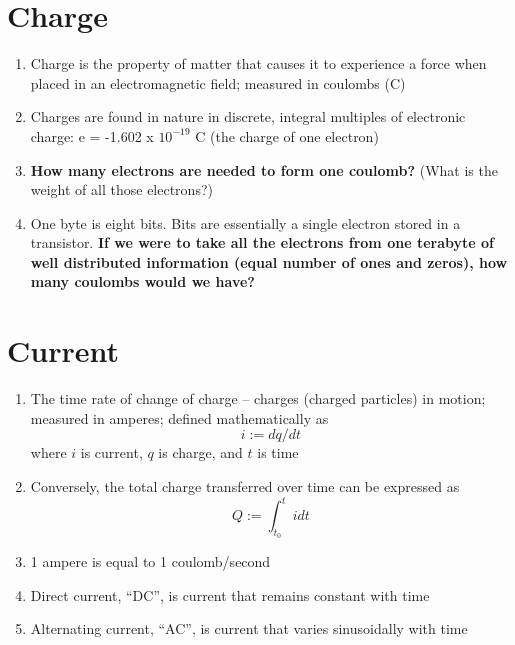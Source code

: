 \documentclass[11pt]{book}
\begin{document}
\section{Charge}
 
\begin{enumerate}
	\item Charge is the property of matter that causes it to experience a force when placed in an electromagnetic field; measured in coulombs (C)
	\item 	Charges are found in nature in discrete, integral multiples of electronic charge: e  = -1.602 x $10^{-19}$ C (the charge of one electron)
	\item \textbf{How many electrons are needed to form one coulomb?} (What is the weight of all those electrons?) 
	\item One byte is eight bits. Bits are essentially a single electron stored in a transistor. \textbf{If we were to take all the electrons from one terabyte of well distributed information (equal number of ones and zeros), how many coulombs would we have?}
\end{enumerate}


\section{Current}
\begin{enumerate}
	\item The time rate of change of charge – charges (charged particles) in motion; measured in amperes; defined mathematically as
	\begin{equation}
	\label{i=dqdt}
		i := dq/dt
	\end{equation}
	where $i$ is current, $q$ is charge, and $t$ is time
	
	\item Conversely, the total charge transferred over time can be expressed as 
	\begin{equation}
	\label{q=it}
		Q := \int_{t_0}^{t}i dt
	\end{equation}

	\item 1 ampere is equal to 1 coulomb/second
	\item Direct current, ``DC'', is current that remains constant with time
	\item Alternating current, ``AC'', is current that varies sinusoidally with time
\end{enumerate}
\end{document}
